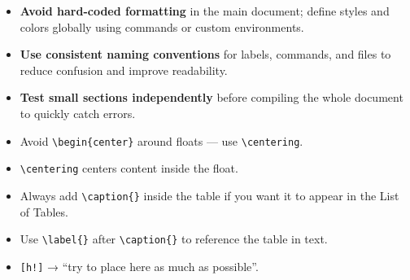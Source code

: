 \documentclass[../../main.tex]{subfiles}
\begin{document}
\begin{itemize}
    \item \textbf{Avoid hard-coded formatting} in the main document; define styles and colors globally using commands or custom environments.
    
    \item \textbf{Use consistent naming conventions} for labels, commands, and files to reduce confusion and improve readability.
    
    \item \textbf{Test small sections independently} before compiling the whole document to quickly catch errors.
\end{itemize}


\begin{itemize}
    \item Avoid \verb|\begin{center}| around floats — use \verb|\centering|.
    \item \verb|\centering| centers content inside the float.
    \item Always add \verb|\caption{}| inside the table if you want it to appear in the List of Tables.
    \item Use \verb|\label{}| after \verb|\caption{}| to reference the table in text.
    \item \verb|[h!]| → “try to place here as much as possible”.
\end{itemize}

\clearpage
\end{document}
